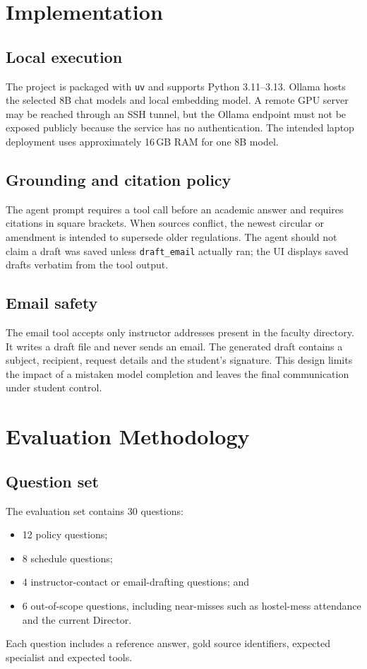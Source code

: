 \documentclass[11pt,a4paper]{article}
\newcommand{\tool}[1]{\texttt{#1}}
\begin{document}
\section{Implementation}
\label{sec:implementation}

\subsection{Local execution}
The project is packaged with \texttt{uv} and supports Python 3.11--3.13. Ollama hosts the selected 8B chat models and local embedding model. A remote GPU server may be reached through an SSH tunnel, but the Ollama endpoint must not be exposed publicly because the service has no authentication. The intended laptop deployment uses approximately 16\,GB RAM for one 8B model.

\subsection{Grounding and citation policy}
The agent prompt requires a tool call before an academic answer and requires citations in square brackets. When sources conflict, the newest circular or amendment is intended to supersede older regulations. The agent should not claim a draft was saved unless \tool{draft\_email} actually ran; the UI displays saved drafts verbatim from the tool output.

\subsection{Email safety}
The email tool accepts only instructor addresses present in the faculty directory. It writes a draft file and never sends an email. The generated draft contains a subject, recipient, request details and the student's signature. This design limits the impact of a mistaken model completion and leaves the final communication under student control.

\section{Evaluation Methodology}
\label{sec:evaluation}

\subsection{Question set}
The evaluation set contains 30 questions:
\begin{itemize}[leftmargin=*]
  \item 12 policy questions;
  \item 8 schedule questions;
  \item 4 instructor-contact or email-drafting questions; and
  \item 6 out-of-scope questions, including near-misses such as hostel-mess attendance and the current Director.
\end{itemize}
Each question includes a reference answer, gold source identifiers, expected specialist and expected tools.
\end{document}
